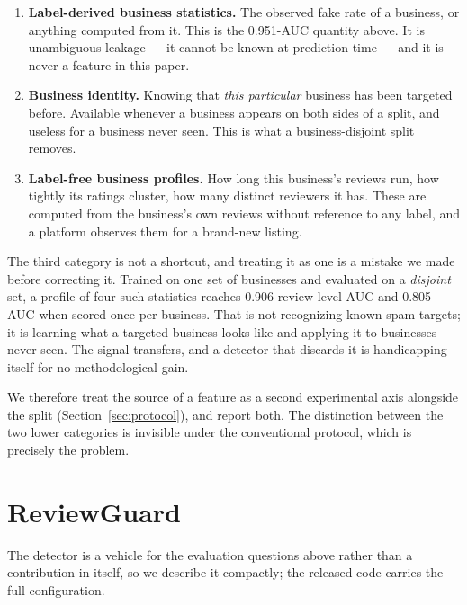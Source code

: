 \documentclass[conference]{IEEEtran}
\begin{document}
\begin{enumerate}[leftmargin=*, topsep=2pt, itemsep=3pt, parsep=0pt]
\item \textbf{Label-derived business statistics.} The observed fake rate of a
      business, or anything computed from it. This is the 0.951-AUC quantity
      above. It is unambiguous leakage --- it cannot be known at prediction
      time --- and it is never a feature in this paper.
\item \textbf{Business identity.} Knowing that \textit{this particular}
      business has been targeted before. Available whenever a business appears
      on both sides of a split, and useless for a business never seen. This is
      what a business-disjoint split removes.
\item \textbf{Label-free business profiles.} How long this business's reviews
      run, how tightly its ratings cluster, how many distinct reviewers it has.
      These are computed from the business's own reviews without reference to
      any label, and a platform observes them for a brand-new listing.
\end{enumerate}

\noindent The third category is not a shortcut, and treating it as one is a
mistake we made before correcting it. Trained on one set of businesses and
evaluated on a \textit{disjoint} set, a profile of four such statistics reaches
0.906 review-level AUC and 0.805 AUC when scored once per business. That is not
recognizing known spam targets; it is learning what a targeted business looks
like and applying it to businesses never seen. The signal transfers, and a
detector that discards it is handicapping itself for no methodological gain.

We therefore treat the source of a feature as a second experimental axis
alongside the split (Section~\ref{sec:protocol}), and report both. The
distinction between the two lower categories is invisible under the
conventional protocol, which is precisely the problem.


\section{ReviewGuard}
\label{sec:method}

The detector is a vehicle for the evaluation questions above rather than a
contribution in itself, so we describe it compactly; the released code carries
the full configuration.
\end{document}

